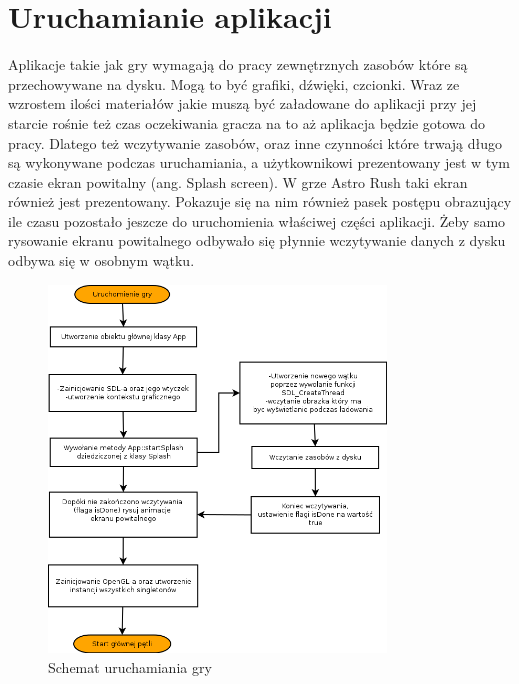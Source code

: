 \section{Uruchamianie aplikacji}
Aplikacje takie jak gry wymagają do pracy zewnętrznych zasobów które są przechowywane na dysku. Mogą to być grafiki, dźwięki, czcionki. Wraz ze wzrostem ilości materiałów jakie muszą być załadowane do aplikacji przy jej starcie rośnie też czas oczekiwania gracza na to aż aplikacja będzie gotowa do pracy. Dlatego też wczytywanie zasobów, oraz inne czynności które trwają długo są wykonywane podczas uruchamiania, a użytkownikowi prezentowany jest w tym czasie ekran powitalny (ang. Splash screen). W grze Astro Rush taki ekran również jest prezentowany. Pokazuje się na nim również pasek postępu obrazujący ile czasu pozostało jeszcze do uruchomienia właściwej części aplikacji. Żeby samo rysowanie ekranu powitalnego odbywało się płynnie wczytywanie danych z dysku odbywa się w osobnym wątku.

\begin{figure}[h]
    \centering
    \includegraphics[width=0.8\textwidth,natwidth=800,natheight=152]{./Pictures/splash.png}
    \caption{Schemat uruchamiania gry}
\end{figure}

